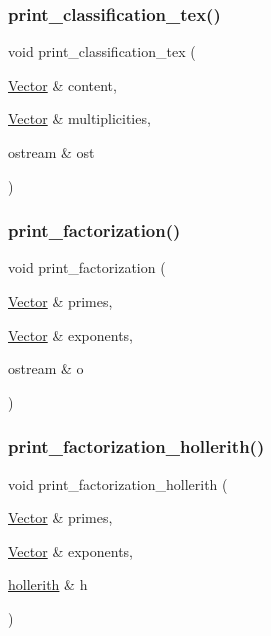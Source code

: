 \mbox{\label{global_8_c_ad0e10e12298c81bc55cda3583f480659}} 
\subsubsection{\texorpdfstring{print\+\_\+classification\+\_\+tex()}{print\_classification\_tex()}\hspace{0.1cm}{\footnotesize\ttfamily [2/2]}}
{\footnotesize\ttfamily void print\+\_\+classification\+\_\+tex (\begin{DoxyParamCaption}\item[{\mbox{\hyperlink{class_vector}{Vector}} \&}]{content,  }\item[{\mbox{\hyperlink{class_vector}{Vector}} \&}]{multiplicities,  }\item[{ostream \&}]{ost }\end{DoxyParamCaption})}

\mbox{\label{global_8_c_aea15358271d4a02df8922f51f2a76113}} 
\subsubsection{\texorpdfstring{print\+\_\+factorization()}{print\_factorization()}}
{\footnotesize\ttfamily void print\+\_\+factorization (\begin{DoxyParamCaption}\item[{\mbox{\hyperlink{class_vector}{Vector}} \&}]{primes,  }\item[{\mbox{\hyperlink{class_vector}{Vector}} \&}]{exponents,  }\item[{ostream \&}]{o }\end{DoxyParamCaption})}

\mbox{\label{global_8_c_a8f01f217650d17b75c87945360dc7abe}} 
\subsubsection{\texorpdfstring{print\+\_\+factorization\+\_\+hollerith()}{print\_factorization\_hollerith()}}
{\footnotesize\ttfamily void print\+\_\+factorization\+\_\+hollerith (\begin{DoxyParamCaption}\item[{\mbox{\hyperlink{class_vector}{Vector}} \&}]{primes,  }\item[{\mbox{\hyperlink{class_vector}{Vector}} \&}]{exponents,  }\item[{\mbox{\hyperlink{classhollerith}{hollerith}} \&}]{h }\end{DoxyParamCaption})}

